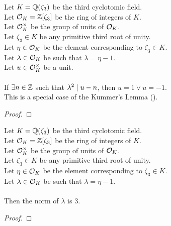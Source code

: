 \begin{theorem}
    \label{lmm:eq_one_or_neg_one_of_unit_of_congruent}
    \leanok
    Let $K = \mathbb{Q}(\zeta_3)$ be the third cyclotomic field. \\
    Let $\mathcal{O}_K = \mathbb{Z}[\zeta_3]$ be the ring of integers of $K$. \\
    Let $\mathcal{O}^\times_K$ be the group of units of $\mathcal{O}_K$. \\
    Let $\zeta_3 \in K$ be any primitive third root of unity. \\
    Let $\eta \in \mathcal{O}_K$ be the element corresponding to $\zeta_3 \in K$. \\
    Let $\lambda \in \mathcal{O}_K$ be such that $\lambda = \eta -1$. \\
    Let $u \in \mathcal{O}^\times_K$ be a unit. \\\\
    If $\exists n \in \mathbb{Z}$ such that $\lambda^2 \mid u - n$, then
    $u = 1 \lor u = -1$. \\
    This is a special case of the Kummer's Lemma ().
\end{theorem}
\begin{proof}
    \leanok
\end{proof}

\begin{lemma}
    \label{lmm:norm_lambda}
    \leanok
    Let $K = \mathbb{Q}(\zeta_3)$ be the third cyclotomic field. \\
    Let $\mathcal{O}_K = \mathbb{Z}[\zeta_3]$ be the ring of integers of $K$. \\
    Let $\mathcal{O}^\times_K$ be the group of units of $\mathcal{O}_K$. \\
    Let $\zeta_3 \in K$ be any primitive third root of unity. \\
    Let $\eta \in \mathcal{O}_K$ be the element corresponding to $\zeta_3 \in K$. \\
    Let $\lambda \in \mathcal{O}_K$ be such that $\lambda = \eta -1$. \\\\
    Then the norm of $\lambda$ is $3$.
\end{lemma}
\begin{proof}
    \leanok
\end{proof}

